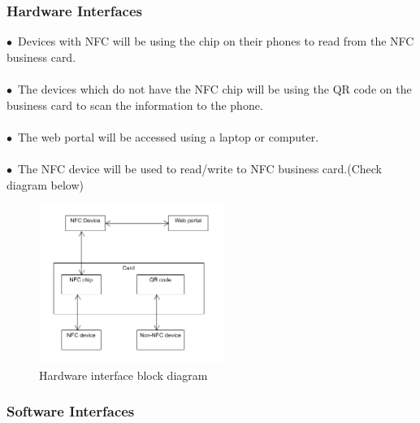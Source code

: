 \documentclass[english]{article}
\begin{document}
\subsubsection{Hardware Interfaces}				
$\bullet$\ Devices with NFC will be using the chip on their phones to read from the NFC business card.\\ \\$\bullet$\
The devices which do not have the NFC chip will be using the QR code on the business card to scan the information to the phone.\\ \\$\bullet$\
The web portal will be accessed using a laptop or computer.\\ \\$\bullet$\
The NFC device will be used to read/write to NFC business card.(Check diagram below)\\
\begin{figure}[ht!]
\centering
\includegraphics[width=60mm]{Hardware.png}
\caption{Hardware interface block diagram }
\end{figure}

				   
\subsubsection{Software Interfaces}
\end{document}
